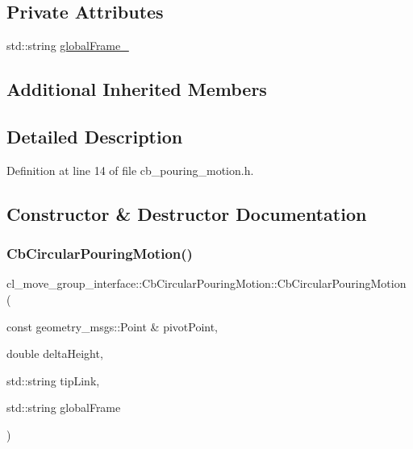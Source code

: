 \subsection*{Private Attributes}
\begin{DoxyCompactItemize}
\item 
std\+::string \hyperlink{classcl__move__group__interface_1_1CbCircularPouringMotion_a1d54253dc370bce8dd413e08b4bf8c43}{global\+Frame\+\_\+}
\end{DoxyCompactItemize}
\subsection*{Additional Inherited Members}


\subsection{Detailed Description}


Definition at line 14 of file cb\+\_\+pouring\+\_\+motion.\+h.



\subsection{Constructor \& Destructor Documentation}
\mbox{\label{classcl__move__group__interface_1_1CbCircularPouringMotion_ae5d136014f6e9cacc5270c0b35b71b18}} 
\subsubsection{\texorpdfstring{Cb\+Circular\+Pouring\+Motion()}{CbCircularPouringMotion()}}
{\footnotesize\ttfamily cl\+\_\+move\+\_\+group\+\_\+interface\+::\+Cb\+Circular\+Pouring\+Motion\+::\+Cb\+Circular\+Pouring\+Motion (\begin{DoxyParamCaption}\item[{const geometry\+\_\+msgs\+::\+Point \&}]{pivot\+Point,  }\item[{double}]{delta\+Height,  }\item[{std\+::string}]{tip\+Link,  }\item[{std\+::string}]{global\+Frame }\end{DoxyParamCaption})}



